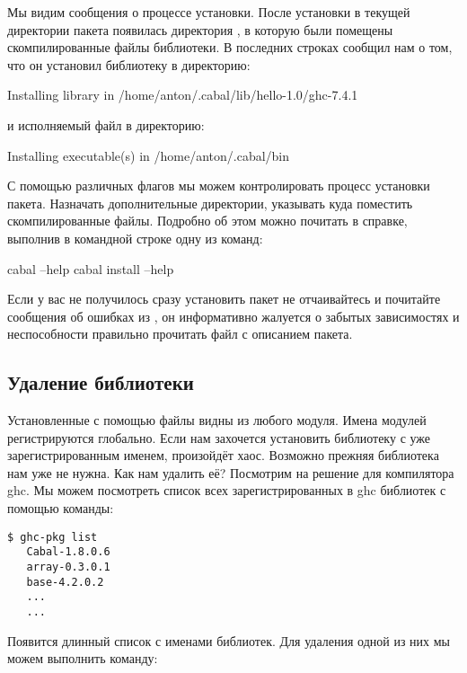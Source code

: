 Мы видим сообщения о процессе установки. После установки в текущей
директории пакета появилась директория , в которую были
помещены скомпилированные файлы библиотеки. В последних строках
 сообщил нам о том, что он установил библиотеку в директорию:


\begin{code}
Installing library in /home/anton/.cabal/lib/hello-1.0/ghc-7.4.1
\end{code}

\noindent 

и исполняемый файл в директорию:


\begin{code}
Installing executable(s) in /home/anton/.cabal/bin
\end{code}

С помощью различных флагов мы можем контролировать процесс установки
пакета. Назначать дополнительные директории, указывать куда поместить
скомпилированные файлы. Подробно об этом можно почитать в справке,
выполнив в командной строке одну из команд:


\begin{code}
cabal --help
cabal install --help
\end{code}

Если у вас не получилось сразу установить пакет не отчаивайтесь и
почитайте сообщения об ошибках из , он информативно жалуется о
забытых зависимостях и неспособности правильно прочитать файл с
описанием пакета.

\subsection{Удаление библиотеки}

Установленные с помощью  файлы видны из любого модуля. Имена
модулей регистрируются глобально. Если нам захочется установить
библиотеку с уже зарегистрированным именем, произойдёт хаос. Возможно
прежняя библиотека нам уже не нужна. Как нам удалить её? Посмотрим на
решение для компилятора ghc. Мы можем посмотреть список всех
зарегистрированных в ghc библиотек с помощью команды:


\begin{verbatim}
$ ghc-pkg list
   Cabal-1.8.0.6
   array-0.3.0.1
   base-4.2.0.2
   ...
   ...
\end{verbatim}

Появится длинный список с именами библиотек. Для удаления одной из них
мы можем выполнить команду:



